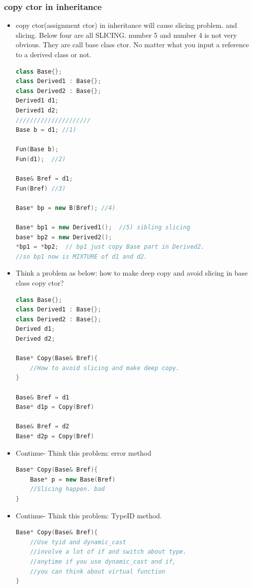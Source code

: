 \documentclass[a4paper,11pt,twoside]{book}
\begin{document}
\subsubsection{copy ctor in inheritance}

\begin{itemize}
	\item copy ctor(assignment ctor) in inheritance will cause slicing problem.  and slicing. Below four are all SLICING.  number 5 and number 4 is not very obvious. They are call base class ctor.  No matter what you input a reference to a derived class or not.
\begin{lstlisting}[frame=single, language=c++]
class Base{};
class Derived1 : Base{};
class Derived2 : Base{};
Derived1 d1;
Derived1 d2;
/////////////////////
Base b = d1; //1)
	
Fun(Base b);
Fun(d1);  //2)
	
Base& Bref = d1;
Fun(Bref) //3)
	
Base* bp = new B(Bref); //4)
	
Base* bp1 = new Derived1();  //5) sibling slicing
base* bp2 = new Derived2();
*bp1 = *bp2;  // bp1 just copy Base part in Derived2.
//so bp1 now is MIXTURE of d1 and d2.
\end{lstlisting}
	
\item Think a problem as below: how to make deep copy and avoid slicing in base class copy ctor?
\begin{lstlisting}[frame=single, language=c++]
class Base{};
class Derived1 : Base{};
class Derived2 : Base{};
Derived d1;
Derived d2;
	
Base* Copy(Base& Bref){
	//How to avoid slicing and make deep copy.
}
	
Base& Bref = d1
Base* d1p = Copy(Bref)

Base& Bref = d2
Base* d2p = Copy(Bref)
	\end{lstlisting}
	
\item Continue- Think this problem: error method
\begin{lstlisting}[frame=single, language=c++]
Base* Copy(Base& Bref){
	Base* p = new Base(Bref)
	//Slicing happen. bad
}
\end{lstlisting}
	\item Continue- Think this problem: TypeID method.
\begin{lstlisting}[frame=single, language=c++]
Base* Copy(Base& Bref){
	//Use tyid and dynamic_cast
	//involve a lot of if and switch about type.
	//anytime if you use dynamic_cast and if,
	//you can think about virtual function
}
\end{lstlisting}
	

\end{itemize}
\end{document}
